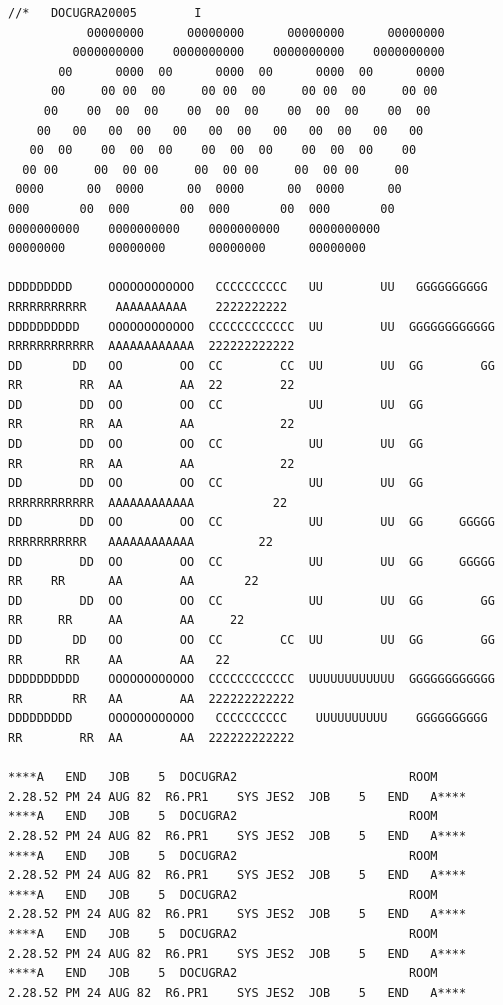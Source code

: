 {\fontsize{4}{5}\selectfont
\begin{verbatim}
//*   DOCUGRA20005        I
           00000000      00000000      00000000      00000000
         0000000000    0000000000    0000000000    0000000000
       00      0000  00      0000  00      0000  00      0000
      00     00 00  00     00 00  00     00 00  00     00 00
     00    00  00  00    00  00  00    00  00  00    00  00
    00   00   00  00   00   00  00   00   00  00   00   00
   00  00    00  00  00    00  00  00    00  00  00    00
  00 00     00  00 00     00  00 00     00  00 00     00
 0000      00  0000      00  0000      00  0000      00
000       00  000       00  000       00  000       00
0000000000    0000000000    0000000000    0000000000
00000000      00000000      00000000      00000000

DDDDDDDDD     OOOOOOOOOOOO   CCCCCCCCCC   UU        UU   GGGGGGGGGG   RRRRRRRRRRR    AAAAAAAAAA    2222222222
DDDDDDDDDD    OOOOOOOOOOOO  CCCCCCCCCCCC  UU        UU  GGGGGGGGGGGG  RRRRRRRRRRRR  AAAAAAAAAAAA  222222222222
DD       DD   OO        OO  CC        CC  UU        UU  GG        GG  RR        RR  AA        AA  22        22
DD        DD  OO        OO  CC            UU        UU  GG            RR        RR  AA        AA            22
DD        DD  OO        OO  CC            UU        UU  GG            RR        RR  AA        AA            22
DD        DD  OO        OO  CC            UU        UU  GG            RRRRRRRRRRRR  AAAAAAAAAAAA           22
DD        DD  OO        OO  CC            UU        UU  GG     GGGGG  RRRRRRRRRRR   AAAAAAAAAAAA         22
DD        DD  OO        OO  CC            UU        UU  GG     GGGGG  RR    RR      AA        AA       22
DD        DD  OO        OO  CC            UU        UU  GG        GG  RR     RR     AA        AA     22
DD       DD   OO        OO  CC        CC  UU        UU  GG        GG  RR      RR    AA        AA   22
DDDDDDDDDD    OOOOOOOOOOOO  CCCCCCCCCCCC  UUUUUUUUUUUU  GGGGGGGGGGGG  RR       RR   AA        AA  222222222222
DDDDDDDDD     OOOOOOOOOOOO   CCCCCCCCCC    UUUUUUUUUU    GGGGGGGGGG   RR        RR  AA        AA  222222222222

****A   END   JOB    5  DOCUGRA2                        ROOM        2.28.52 PM 24 AUG 82  R6.PR1    SYS JES2  JOB    5   END   A****
****A   END   JOB    5  DOCUGRA2                        ROOM        2.28.52 PM 24 AUG 82  R6.PR1    SYS JES2  JOB    5   END   A****
****A   END   JOB    5  DOCUGRA2                        ROOM        2.28.52 PM 24 AUG 82  R6.PR1    SYS JES2  JOB    5   END   A****
****A   END   JOB    5  DOCUGRA2                        ROOM        2.28.52 PM 24 AUG 82  R6.PR1    SYS JES2  JOB    5   END   A****
****A   END   JOB    5  DOCUGRA2                        ROOM        2.28.52 PM 24 AUG 82  R6.PR1    SYS JES2  JOB    5   END   A****
****A   END   JOB    5  DOCUGRA2                        ROOM        2.28.52 PM 24 AUG 82  R6.PR1    SYS JES2  JOB    5   END   A****
\end{verbatim}
}

